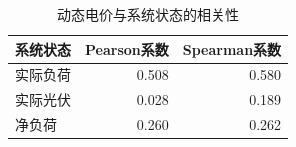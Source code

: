 \begin{table}[H]
\centering
\small
\caption{动态电价与系统状态的相关性}
\label{tab:q4-price-correlation}
\begin{tabular}{lrr}
\toprule
系统状态 & Pearson系数 & Spearman系数 \\
\midrule
实际负荷 & 0.508 & 0.580 \\
实际光伏 & 0.028 & 0.189 \\
净负荷 & 0.260 & 0.262 \\
\bottomrule
\end{tabular}
\end{table}
